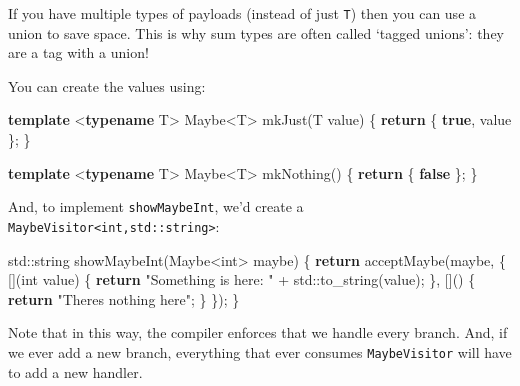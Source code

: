 \documentclass[]{article}
\newenvironment{Shaded}{}{}
\newcommand{\BuiltInTok}[1]{\textcolor[rgb]{0.00,0.50,0.00}{#1}}
\newcommand{\ControlFlowTok}[1]{\textcolor[rgb]{0.00,0.44,0.13}{\textbf{#1}}}
\newcommand{\DataTypeTok}[1]{\textcolor[rgb]{0.56,0.13,0.00}{#1}}
\newcommand{\KeywordTok}[1]{\textcolor[rgb]{0.00,0.44,0.13}{\textbf{#1}}}
\newcommand{\NormalTok}[1]{#1}
\newcommand{\OperatorTok}[1]{\textcolor[rgb]{0.40,0.40,0.40}{#1}}
\newcommand{\StringTok}[1]{\textcolor[rgb]{0.25,0.44,0.63}{#1}}
\begin{document}
If you have multiple types of payloads (instead of just \texttt{T}) then you can
use a union to save space. This is why sum types are often called `tagged
unions': they are a tag with a union!

You can create the values using:

\begin{Shaded}
\begin{Highlighting}[]
\KeywordTok{template} \OperatorTok{\textless{}}\KeywordTok{typename}\NormalTok{ T}\OperatorTok{\textgreater{}}
\NormalTok{Maybe}\OperatorTok{\textless{}}\NormalTok{T}\OperatorTok{\textgreater{}}\NormalTok{ mkJust}\OperatorTok{(}\NormalTok{T value}\OperatorTok{)} \OperatorTok{\{} \ControlFlowTok{return} \OperatorTok{\{} \KeywordTok{true}\OperatorTok{,}\NormalTok{ value }\OperatorTok{\};} \OperatorTok{\}}

\KeywordTok{template} \OperatorTok{\textless{}}\KeywordTok{typename}\NormalTok{ T}\OperatorTok{\textgreater{}}
\NormalTok{Maybe}\OperatorTok{\textless{}}\NormalTok{T}\OperatorTok{\textgreater{}}\NormalTok{ mkNothing}\OperatorTok{()} \OperatorTok{\{} \ControlFlowTok{return} \OperatorTok{\{} \KeywordTok{false} \OperatorTok{\};} \OperatorTok{\}}
\end{Highlighting}
\end{Shaded}

And, to implement \texttt{showMaybeInt}, we'd create a
\texttt{MaybeVisitor\textless{}int,std::string\textgreater{}}:

\begin{Shaded}
\begin{Highlighting}[]
\BuiltInTok{std::}\NormalTok{string showMaybeInt}\OperatorTok{(}\NormalTok{Maybe}\OperatorTok{\textless{}}\DataTypeTok{int}\OperatorTok{\textgreater{}}\NormalTok{ maybe}\OperatorTok{)} \OperatorTok{\{}
    \ControlFlowTok{return}\NormalTok{ acceptMaybe}\OperatorTok{(}\NormalTok{maybe}\OperatorTok{,} \OperatorTok{\{}
        \OperatorTok{[](}\DataTypeTok{int}\NormalTok{ value}\OperatorTok{)} \OperatorTok{\{} \ControlFlowTok{return} \StringTok{"Something is here: "} \OperatorTok{+} \BuiltInTok{std::}\NormalTok{to\_string}\OperatorTok{(}\NormalTok{value}\OperatorTok{);} \OperatorTok{\},}
        \OperatorTok{[]()} \OperatorTok{\{} \ControlFlowTok{return} \StringTok{"There\textquotesingle{}s nothing here"}\OperatorTok{;} \OperatorTok{\}}
    \OperatorTok{\});}
\OperatorTok{\}}
\end{Highlighting}
\end{Shaded}

Note that in this way, the compiler enforces that we handle every branch. And,
if we ever add a new branch, everything that ever consumes \texttt{MaybeVisitor}
will have to add a new handler.
\end{document}
